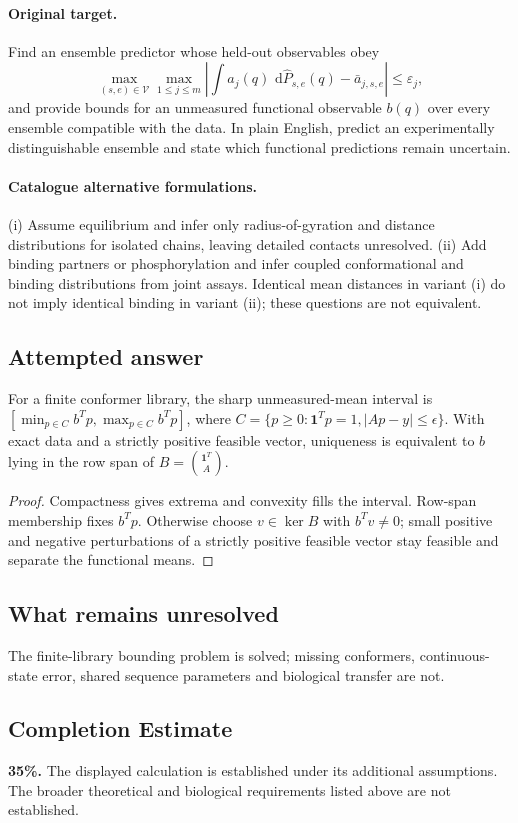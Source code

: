 \documentclass[11pt]{article}
\begin{document}
\paragraph{Original target.}
Find an ensemble predictor whose held-out observables obey
\[
\max_{(s,e)\in\mathcal V}\max_{1\leq j\leq m}
\left|\int a_j(q)\,\,\mathrm{d}\widehat P_{s,e}(q)-\bar a_{j,s,e}\right|\leq\varepsilon_j,
\]
and provide bounds for an unmeasured functional observable $b(q)$ over every ensemble compatible with the data. In plain English, predict an experimentally distinguishable ensemble and state which functional predictions remain uncertain.
\paragraph{Catalogue alternative formulations.}
(i) Assume equilibrium and infer only radius-of-gyration and distance distributions for isolated chains, leaving detailed contacts unresolved. (ii) Add binding partners or phosphorylation and infer coupled conformational and binding distributions from joint assays. Identical mean distances in variant (i) do not imply identical binding in variant (ii); these questions are not equivalent.
\subsection{Attempted answer}
\begin{proposition}
For a finite conformer library, the sharp unmeasured-mean interval is $[\min_{p\in C}b^Tp,\max_{p\in C}b^Tp]$, where $C=\{p\geq0:\mathbf1^Tp=1,|Ap-y|\leq\epsilon\}$. With exact data and a strictly positive feasible vector, uniqueness is equivalent to $b$ lying in the row span of $B=\binom{\mathbf1^T}{A}$.
\end{proposition}
\begin{proof}
Compactness gives extrema and convexity fills the interval. Row-span membership fixes $b^Tp$. Otherwise choose $v\in\ker B$ with $b^Tv\ne0$; small positive and negative perturbations of a strictly positive feasible vector stay feasible and separate the functional means.
\end{proof}
\subsection{What remains unresolved}
The finite-library bounding problem is solved; missing conformers, continuous-state error, shared sequence parameters and biological transfer are not.
\subsection{Completion Estimate}
\textbf{35\%.} The displayed calculation is established under its additional assumptions. The broader theoretical and biological requirements listed above are not established.
\end{document}
